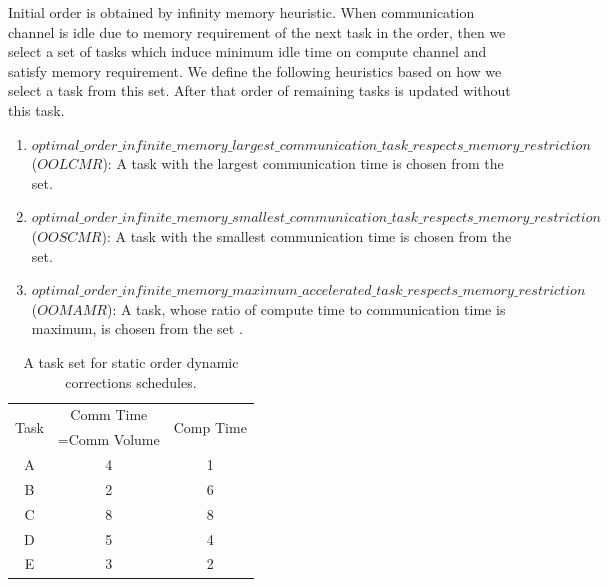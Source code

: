 \documentclass[sigconf]{acmart}
\begin{document}
	Initial order is obtained by infinity memory heuristic. When communication channel is idle due to memory requirement of the next task in the order, then we select a set of tasks which induce minimum idle time on compute channel and satisfy memory requirement. We define the following heuristics based on how we select a task from this set. After that order of remaining  tasks is updated without this task.
	
	\begin{enumerate}[label=\roman*)]
		\item $optimal\_order\_infinite\_memory\_largest\_communication\_task\_respects\_memory\_restriction$ ($OOLCMR$): A task with the largest communication time is chosen from the set.
		\item $optimal\_order\_infinite\_memory\_smallest\_communication\_task\_respects\_memory\_restriction$ ($OOSCMR$):  A task with the smallest communication time is chosen from the set.
		\item $optimal\_order\_infinite\_memory\_maximum\_accelerated\_task\_respects\_memory\_restriction$ ($OOMAMR$): A task,  whose ratio of compute time to communication time is maximum, is chosen from the set .
	\end{enumerate}
	
	\begin{table}[htb]
		\begin{center}
			
			\begin{tabular}{|c|c|c|}
				\hline
				\multirow{2}{*}{Task} & Comm Time & \multirow{2}{*}{Comp Time}\\ 
				&=Comm Volume& \\ \hline
				A & 4 & 1\\ \hline
				B & 2 & 6\\ \hline
				C & 8 & 8\\ \hline
				D & 5 & 4\\ \hline
				E & 3 & 2\\ \hline
			\end{tabular}
			\caption{\label{tab:staticOrderDynamicCorrectionsExample} A task set for static order dynamic corrections schedules.}
		\end{center}
	\end{table}
	
\end{document}
